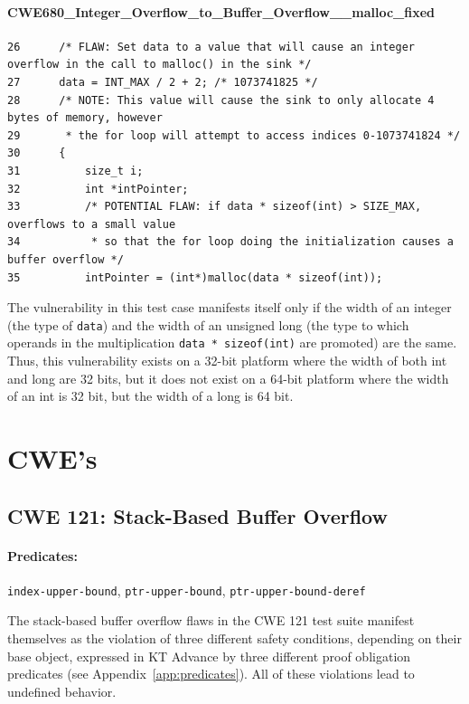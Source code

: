 \documentclass[11pt]{article}
\begin{document}
\paragraph{CWE680\_Integer\_Overflow\_to\_Buffer\_Overflow\_\_malloc\_fixed}
\begin{tiny}
\begin{verbatim}
26      /* FLAW: Set data to a value that will cause an integer overflow in the call to malloc() in the sink */
27      data = INT_MAX / 2 + 2; /* 1073741825 */
28      /* NOTE: This value will cause the sink to only allocate 4 bytes of memory, however
29       * the for loop will attempt to access indices 0-1073741824 */
30      {
31          size_t i;
32          int *intPointer;
33          /* POTENTIAL FLAW: if data * sizeof(int) > SIZE_MAX, overflows to a small value
34           * so that the for loop doing the initialization causes a buffer overflow */
35          intPointer = (int*)malloc(data * sizeof(int));
\end{verbatim}
\end{tiny}
The vulnerability in this test case manifests itself only if the width of an integer
(the type of {\tt data}) and the width of an unsigned long (the type to which operands
in the multiplication {\tt data * sizeof(int)} are promoted) are the same. Thus, this
vulnerability exists on a 32-bit platform where the width of both int and long are 32
bits, but it does not exist on a 64-bit platform where the width of an int is 32 bit,
but the width of a long is 64 bit.

\section{CWE's}
\label{sec:cwes}

\subsection{CWE 121: Stack-Based Buffer Overflow}

\paragraph{Predicates:} {\tt index-upper-bound},  {\tt ptr-upper-bound}, {\tt ptr-upper-bound-deref}

The stack-based buffer overflow flaws in the CWE 121 test suite manifest themselves
as the violation of three
different safety conditions, depending on their base object, expressed in KT Advance 
by three different proof obligation 
predicates (see Appendix~\ref{app:predicates}). All of these violations lead to
undefined behavior.
\end{document}
